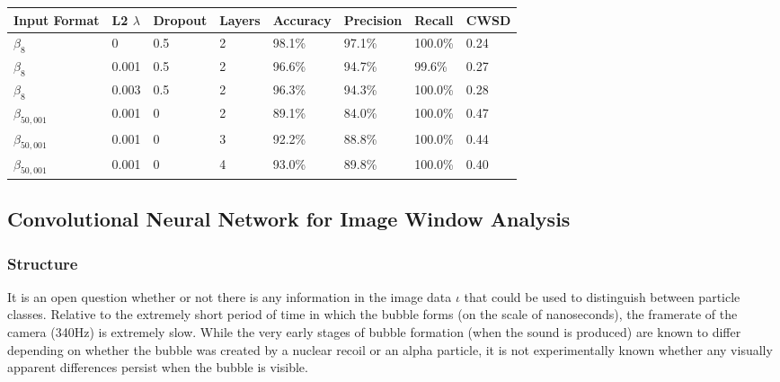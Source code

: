 \documentclass[10pt]{article}
\begin{document}
\begin{minipage}{\textwidth}
    \begin{center}
         \label{fft_wall_cuts}
        \begin{tabular}{|l|l|l|l|l|l|l|l|}
            \hline
            Input Format & L2 $\lambda$ & Dropout & Layers & Accuracy & Precision & Recall & CWSD \\
            \hline
            $\beta_8$ & 0 & 0.5 & 2 & 98.1\% & 97.1\% & 100.0\% & 0.24 \\
            \hline
            $\beta_8$ & 0.001 & 0.5 & 2 & 96.6\% & 94.7\% & 99.6\% & 0.27 \\
            \hline
            $\beta_8$ & 0.003 & 0.5 & 2 & 96.3\% & 94.3\% & 100.0\% & 0.28 \\
            \hline
            $\beta_{50,001}$ & 0.001 & 0 & 2 & 89.1\% & 84.0\% & 100.0\% & 0.47 \\
            \hline
            $\beta_{50,001}$ & 0.001 & 0 & 3 & 92.2\% & 88.8\% & 100.0\% & 0.44 \\
            \hline
            $\beta_{50,001}$ & 0.001 & 0 & 4 & 93.0\% & 89.8\% & 100.0\% & 0.40 \\
            \hline
        \end{tabular}
    \end{center}
\end{minipage}

\subsection{Convolutional Neural Network for Image Window Analysis}

\subsubsection{Structure}

It is an open question whether or not there is any information in the image data $\iota$ that could be used to distinguish between particle classes. Relative to the extremely short period of time in which the bubble forms (on the scale of nanoseconds), the framerate of the camera (340Hz) is extremely slow. While the very early stages of bubble formation (when the sound is produced) are known to differ depending on whether the bubble was created by a nuclear recoil or an alpha particle, it is not experimentally known whether any visually apparent differences persist when the bubble is visible.
\end{document}
